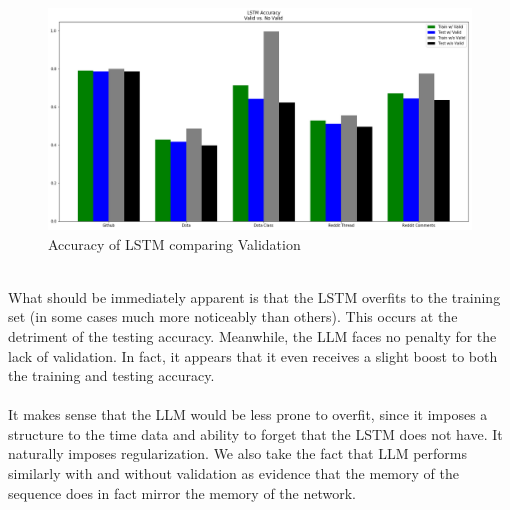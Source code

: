 \begin{figure}
    \centering
    \includegraphics[width=1.0\textwidth]{figures/LSTM_Valid.png}
    \caption{Accuracy of LSTM comparing Validation}
    \label{fig:lstmValid}
\end{figure}
\textit{ }\\What should be immediately apparent is that the LSTM overfits to the training set (in some cases much more noticeably than others). This occurs at the detriment of the testing accuracy. Meanwhile, the LLM faces no penalty for the lack of validation. In fact, it appears that it even receives a slight boost to both the training and testing accuracy. 
\\\\ It makes sense that the LLM would be less prone to overfit, since it imposes a structure to the time data and ability to forget that the LSTM does not have. It naturally imposes regularization. We also take the fact that LLM performs similarly with and without validation as evidence that the memory of the sequence does in fact mirror the memory of the network. 
